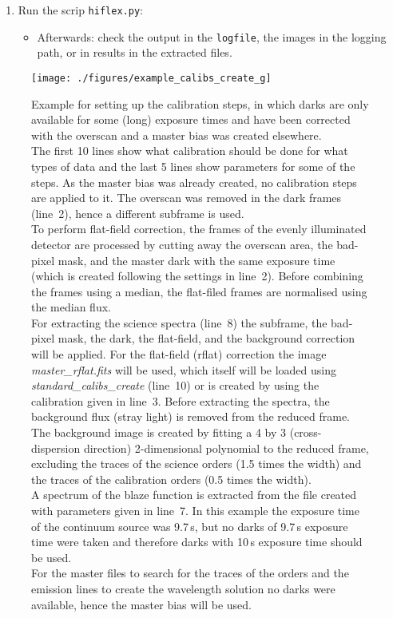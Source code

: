 \documentclass[10pt,a4paper]{article}
\begin{document}
\begin{enumerate}
  \item Run the scrip \verb|hiflex.py|: \vspace*{-\itemsep}
  \begin{itemize}[leftmargin=*]\setlength\itemsep{0em}
    \item Afterwards: check the output in the \verb|logfile|, the images in the logging path, or in results in the extracted files.
  \end{itemize}
  
\end{enumerate}


\begin{figure} 
  \begin{center}
    \texttt{[image: ./figures/example\_calibs\_create\_g]}
  \end{center}
  \caption{\small Example for setting up the calibration steps, in which darks are only available for some (long) exposure times and have been corrected with the overscan and a master bias was created elsewhere.\\
   The first 10 lines show what calibration should be done for what types of data and the last 5 lines show parameters for some of the steps. As the master bias was already created, no calibration steps are applied to it.
   The overscan was removed in the dark frames (line~2), hence a different subframe is used.\\
   To perform flat-field correction, the frames of the evenly illuminated detector are processed by cutting away the overscan area, the bad-pixel mask, and the master dark with the same exposure time (which is created following the settings in line~2). Before combining the frames using a median, the flat-filed frames are normalised using the median flux.\\
    For extracting the science spectra (line~8) the subframe, the bad-pixel mask, the dark, the flat-field, and the background correction will be applied. For the flat-field (rflat) correction the image \textit{master\_rflat.fits} will be used, which itself will be loaded using \textit{standard\_calibs\_create} (line~10) or is created by using the calibration given in line~3. Before extracting the spectra, the background flux (stray light) is removed from the reduced frame. The background image is created by fitting a 4 by 3 (cross-dispersion direction) 2-dimensional polynomial to the reduced frame, excluding the traces of the science orders (1.5 times the width) and the traces of the calibration orders (0.5 times the width).\\
    A spectrum of the blaze function is extracted from the file created with parameters given in line~7. In this example the exposure time of the continuum source was 9.7\,s, but no darks of 9.7\,s exposure time were taken and therefore darks with 10\,s exposure time should be used.\\
    For the master files to search for the traces of the orders and the emission lines to create the wavelength solution no darks were available, hence the master bias will be used.
    \label{Fig:example_calibs_create_g}}
\end{figure}
\end{document}
